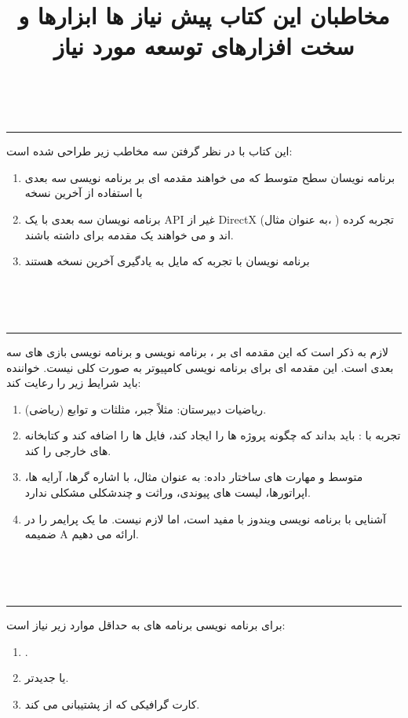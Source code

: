 \title{
    \LARGE
    \textbf{مخاطبان این کتاب}
}
\\ \rule{\textwidth}{0.5pt}
{  \large
این کتاب با در نظر گرفتن سه مخاطب زیر طراحی شده است:
    \begin{enumerate}
        \item {برنامه نویسان سطح متوسط  که می خواهند مقدمه ای بر برنامه نویسی سه بعدی با استفاده از آخرین نسخه }
        \item {برنامه نویسان سه بعدی با یک API غیر از DirectX (به عنوان مثال، ) تجربه کرده اند و می خواهند یک مقدمه برای  داشته باشند.}
        \item {برنامه نویسان با تجربه  که مایل به یادگیری آخرین نسخه  هستند}
    \end{enumerate}
} \\[50pt]

\title{
    \LARGE
    \textbf{پیش نیاز ها}
}
\\ \rule{\textwidth}{0.5pt}
{  \large
لازم به ذکر است که این مقدمه ای بر ، برنامه نویسی  و برنامه نویسی بازی های سه بعدی است. این مقدمه ای برای برنامه نویسی کامپیوتر به صورت کلی نیست. خواننده باید شرایط زیر را رعایت کند:
    \begin{enumerate}
        \item {ریاضیات دبیرستان: مثلاً جبر، مثلثات و توابع (ریاضی).}
        \item {تجربه با : باید بداند که چگونه پروژه ها را ایجاد کند، فایل ها را اضافه کند و کتابخانه های خارجی را  کند.}
        \item { متوسط و مهارت های ساختار داده: به عنوان مثال، با اشاره گرها، آرایه ها،  اپراتورها، لیست های پیوندی، وراثت و چندشکلی مشکلی ندارد.}
        \item {آشنایی با برنامه نویسی ویندوز با  مفید است، اما لازم نیست. ما یک پرایمر  را در ضمیمه A ارائه می دهیم.}
    \end{enumerate}
} \\[50pt]

\title{
    \LARGE
    \textbf{ابزارها و سخت افزارهای توسعه مورد نیاز}
}
\\ \rule{\textwidth}{0.5pt}
{  \large
برای برنامه نویسی برنامه های  به حداقل موارد زیر نیاز است:
    \begin{enumerate}
        \item {.}
        \item { یا جدیدتر.}
        \item {کارت گرافیکی که از  پشتیبانی می کند.}
    \end{enumerate}
}

